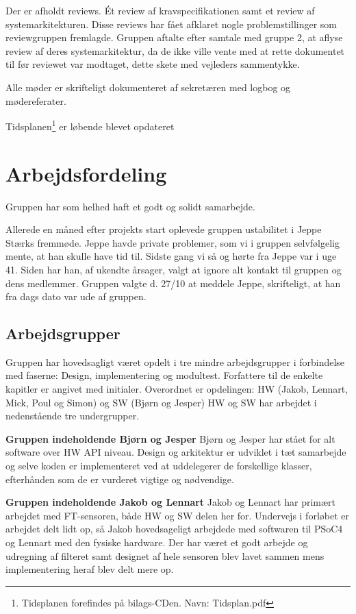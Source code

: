 Der er afholdt reviews. Ét review af kravspecifikationen samt et review af systemarkitekturen. 
Disse reviews har fået afklaret nogle problemstillinger som reviewgruppen fremlagde. 
Gruppen aftalte efter samtale med gruppe 2, at aflyse review af deres systemarkitektur, da de ikke ville vente med at rette dokumentet til før reviewet var modtaget, dette skete med vejleders sammentykke.  

Alle møder er skrifteligt dokumenteret af sekretæren med logbog og mødereferater. 

Tidsplanen\footnote{Tidsplanen forefindes på bilags-CDen. Navn: Tidsplan.pdf} er løbende blevet opdateret 

\section{Arbejdsfordeling}

Gruppen har som helhed haft et godt og solidt samarbejde. 

Allerede en måned efter projekts start oplevede gruppen ustabilitet i Jeppe Stærks fremmøde. Jeppe havde private problemer, som vi i gruppen selvfølgelig mente, at han skulle have tid til. Sidste gang vi så og hørte fra Jeppe var i uge 41. Siden har han, af ukendte årsager, valgt at ignore alt kontakt til gruppen og dens medlemmer. Gruppen valgte d. 27/10 at meddele Jeppe, skrifteligt, at han fra dags dato var ude af gruppen.     

\subsection{Arbejdsgrupper}
Gruppen har hovedsagligt været opdelt i tre mindre arbejdsgrupper i forbindelse med faserne: Design, implementering og modultest. Forfattere til de enkelte kapitler er angivet med initialer.
Overordnet er opdelingen: HW (Jakob, Lennart, Mick, Poul og Simon) og SW (Bjørn og Jesper) 
HW og SW har arbejdet i nedenstående tre undergrupper.

\textbf{Gruppen indeholdende Bjørn og Jesper} \newline
Bjørn og Jesper har stået for alt software over HW API niveau. Design og arkitektur er udviklet i tæt samarbejde og selve koden er implementeret ved at uddelegerer de forskellige klasser, efterhånden som de er vurderet vigtige og nødvendige.

\textbf{Gruppen indeholdende Jakob og Lennart} \newline
Jakob og Lennart har primært arbejdet med FT-sensoren, både HW og SW delen her for. Undervejs i forløbet er arbejdet delt lidt op, så Jakob hovedsageligt arbejdede med softwaren til PSoC4 og Lennart med den fysiske hardware. Der har været et godt arbejde og udregning af filteret samt designet af hele sensoren blev lavet sammen mens implementering heraf blev delt mere op. 


